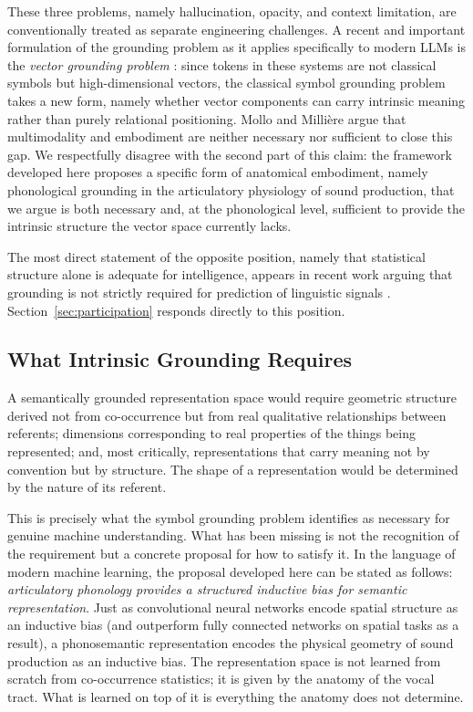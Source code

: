 \documentclass[12pt]{article}
\begin{document}
These three problems, namely hallucination, opacity, and context limitation, are conventionally treated as separate engineering challenges. A recent and important formulation of the grounding problem as it applies specifically to modern LLMs is the \textit{vector grounding problem} \cite{mollo2025}: since tokens in these systems are not classical symbols but high-dimensional vectors, the classical symbol grounding problem \cite{harnad1990} takes a new form, namely whether vector components can carry intrinsic meaning rather than purely relational positioning. Mollo and Milli\`{e}re \cite{mollo2025} argue that multimodality and embodiment are neither necessary nor sufficient to close this gap. We respectfully disagree with the second part of this claim: the framework developed here proposes a specific form of anatomical embodiment, namely phonological grounding in the articulatory physiology of sound production, that we argue is both necessary and, at the phonological level, sufficient to provide the intrinsic structure the vector space currently lacks.

The most direct statement of the opposite position, namely that statistical structure alone is adequate for intelligence, appears in recent work arguing that grounding is not strictly required for prediction of linguistic signals \cite{anon2026intelligence}. Section~\ref{sec:participation} responds directly to this position.

\subsection{What Intrinsic Grounding Requires}

A semantically grounded representation space would require geometric structure derived not from co-occurrence but from real qualitative relationships between referents; dimensions corresponding to real properties of the things being represented; and, most critically, representations that carry meaning not by convention but by structure. The shape of a representation would be determined by the nature of its referent.

This is precisely what the symbol grounding problem \cite{harnad1990} identifies as necessary for genuine machine understanding. What has been missing is not the recognition of the requirement but a concrete proposal for how to satisfy it. In the language of modern machine learning, the proposal developed here can be stated as follows: \textit{articulatory phonology provides a structured inductive bias for semantic representation}. Just as convolutional neural networks encode spatial structure as an inductive bias (and outperform fully connected networks on spatial tasks as a result), a phonosemantic representation encodes the physical geometry of sound production as an inductive bias. The representation space is not learned from scratch from co-occurrence statistics; it is given by the anatomy of the vocal tract. What is learned on top of it is everything the anatomy does not determine.
\end{document}
